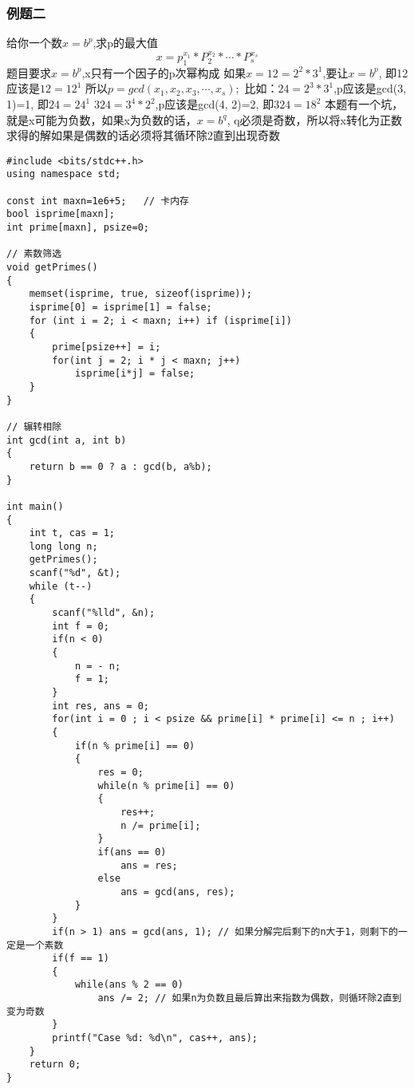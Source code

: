 \subsubsection{例题二}
给你一个数$ x=b^p $,求p的最大值
$$ x=p_{1}^{x_1}\ast P_{2}^{x_2}\ast\cdots\ast P_{s}^{x_s} $$
题目要求$ x=b^p $,x只有一个因子的p次幂构成
如果$ x=12=2^2\ast 3^1 $,要让$ x=b^p $, 即12应该是$ 12=12^1 $
所以$ p=gcd(x_1,x_2,x_3,\cdots,x_s); $
比如：$ 24=2^3\ast 3^1 $,p应该是gcd(3, 1)=1, 即$ 24=24^1 $
	 $ 324=3^4\ast 2^2 $,p应该是gcd(4, 2)=2, 即$ 324=18^2 $
本题有一个坑，就是x可能为负数，如果x为负数的话，$ x=b^q $, q必须是奇数，所以将x转化为正数求得的解如果是偶数的话必须将其循环除2直到出现奇数
\begin{lstlisting}
#include <bits/stdc++.h>
using namespace std;

const int maxn=1e6+5;   // 卡内存
bool isprime[maxn];
int prime[maxn], psize=0;

// 素数筛选
void getPrimes()
{
	memset(isprime, true, sizeof(isprime));
	isprime[0] = isprime[1] = false;
	for (int i = 2; i < maxn; i++) if (isprime[i])
	{
		prime[psize++] = i;
		for(int j = 2; i * j < maxn; j++)
			isprime[i*j] = false;
	}
}

// 辗转相除
int gcd(int a, int b)
{
	return b == 0 ? a : gcd(b, a%b);
}

int main()
{
	int t, cas = 1;
	long long n;
	getPrimes();
	scanf("%d", &t);
	while (t--)
	{
		scanf("%lld", &n);
		int f = 0;
		if(n < 0)
		{
			n = - n;
			f = 1;
		}
		int res, ans = 0;
		for(int i = 0 ; i < psize && prime[i] * prime[i] <= n ; i++)
		{
			if(n % prime[i] == 0)
			{
				res = 0;
				while(n % prime[i] == 0)
				{
					res++;
					n /= prime[i];
				}
				if(ans == 0)
					ans = res;
				else
					ans = gcd(ans, res);
			}
		}
		if(n > 1) ans = gcd(ans, 1); // 如果分解完后剩下的n大于1，则剩下的一定是一个素数
		if(f == 1)
		{
			while(ans % 2 == 0)
				ans /= 2; // 如果n为负数且最后算出来指数为偶数，则循环除2直到变为奇数
		}
		printf("Case %d: %d\n", cas++, ans);
	}
	return 0;
}
\end{lstlisting}

